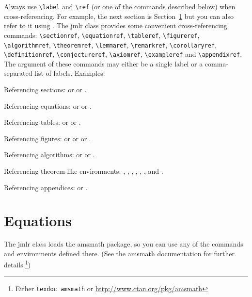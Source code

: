 \documentclass[pmlr,twocolumn,10pt]{jmlr} %
\begin{document}
Always use \verb|\label| and \verb|\ref| (or one of the commands
described below) when cross-referencing.  For example, the next
section is Section~\ref{sec:math} but you can also refer to it using
. The \textsf{jmlr} class
provides some convenient cross-referencing commands:
\verb|\sectionref|, \verb|\equationref|, \verb|\tableref|,
\verb|\figureref|, \verb|\algorithmref|, \verb|\theoremref|,
\verb|\lemmaref|, \verb|\remarkref|, \verb|\corollaryref|,
\verb|\definitionref|, \verb|\conjectureref|, \verb|\axiomref|,
\verb|\exampleref| and \verb|\appendixref|. The argument of these
commands may either be a single label or a comma-separated list
of labels. Examples:

Referencing sections:  or
 or
.

Referencing equations:  or
 or
.

Referencing tables:  or
 or
.

Referencing figures:  or
 or
 or
.

Referencing algorithms:  or
 or
.

Referencing theorem-like environments: ,
, , 
, ,
,  and
.

Referencing appendices:  or
.

\section{Equations}
\label{sec:math}

The \textsf{jmlr} class loads the \textsf{amsmath} package, so
you can use any of the commands and environments defined there.
(See the \textsf{amsmath} documentation for further
details.\footnote{Either \texttt{texdoc amsmath} or
\url{http://www.ctan.org/pkg/amsmath}})
\end{document}
